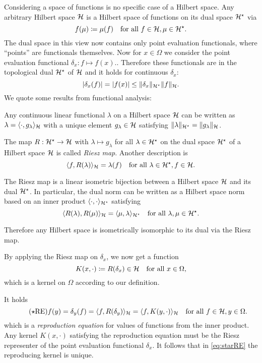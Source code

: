 \documentclass[../lecture-notes.tex]{subfiles}
\begin{document}
Considering a space of functions is no specific case of a Hilbert space. Any arbitrary Hilbert space $\mathcal{H}$ is a Hilbert space of functions on its dual space $\mathcal{H}^{\star}$ via
\[
	f(\mu) \coloneqq \mu(f) \quad \text{for all } f \in \mathcal{H}, \mu \in \mathcal{H}^{\star}.
\] 
The dual space in this view now contains only point evaluation functionals, where ``points'' are functionals themselves.
Now for $x \in \Omega$ we consider the point evaluation functional $\delta_x : f \mapsto f(x)$..
Therefore these functionals are in the topological dual $\mathcal{H}^{\star}$ of $\mathcal{H}$ and it holds for continuous $\delta_x$:
\[
	|\delta_x(f)| = |f(x)| \leq \| \delta_x \|_{\mathcal{H}^{\star}} \| f \|_{\mathcal{H}}.
\]
We quote some results from functional analysis:
\begin{theorem} %
\label{thm:3}
Any continuous linear functional $\lambda$ on a Hilbert space $\mathcal{H}$ can be written as $\lambda = \langle \cdot, g_\lambda \rangle_{\mathcal{H}}$ with a unique element $g_\lambda \in \mathcal{H}$ satisfying $\| \lambda \|_{\mathcal{H}^{\star}} = \| g_\lambda \|_{\mathcal{H}}$.
\end{theorem}
\begin{definition} %
\label{thm:4}
The  map $R : \mathcal{H}^{\star} \to \mathcal{H}$ with $\lambda \mapsto g_\lambda$ for all $\lambda \in \mathcal{H}^{\star}$ on the dual space $\mathcal{H}^{\star}$ of a Hilbert space $\mathcal{H}$ is called \emph{Riesz map}. Another description is
\[
	\langle f, R(\lambda) \rangle_{\mathcal{H}} = \lambda(f) \quad \text{for all } \lambda \in \mathcal{H}^{\star}, f \in \mathcal{H}.
\]
\end{definition}
\begin{theorem} %
\label{thm:5}
The Riesz map is a linear isometric bijection between a Hilbert space $\mathcal{H}$ and its dual $\mathcal{H}^{\star}$. In particular, the dual norm can be written as a Hilbert space norm based on an inner product $\langle \cdot, \cdot \rangle_{\mathcal{H}^{\star}}$ satisfying
\[
	\langle R(\lambda), R(\mu) \rangle_{\mathcal{H}} = \langle \mu, \lambda \rangle_{\mathcal{H}^{\star}} \quad \text{for all } \lambda, \mu \in \mathcal{H}^{\star}.
\]
\end{theorem}
Therefore any Hilbert space is isometrically isomorphic to its dual via the Riesz map.

By applying the Riesz map on $\delta_x$, we now get a function
\[
	K(x, \cdot) \coloneqq R(\delta_x) \in \mathcal{H} \quad \text{for all } x \in \Omega,
\]
which is a kernel on $\Omega$ according to our definition.

It holds
\begin{equation} %
\label{eq:starRE}
\tag{$\star$RE}
	f(y) = \delta_y(f) = \langle f, R(\delta_y) \rangle_{\spH} = \langle f, K(y, \cdot) \rangle_{\spH} \quad \text{for all } f \in \spH, y \in \Omega.
\end{equation}
which is a \emph{reproduction equation} for values of functions from the inner product.
Any kernel $K(x, \cdot)$ satisfying the reproduction equation must be the Riesz representer of the point evaluation functional $\delta_x$. It follows that in \cref{eq:starRE} the reproducing kernel is unique.
\end{document}
